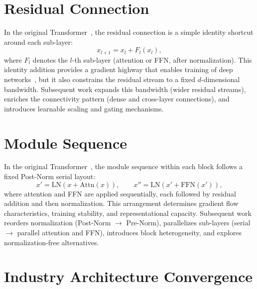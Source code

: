 \documentclass[11pt, a4paper]{article}
\begin{document}


\section{Residual Connection}
\label{sec:residual-connection}

In the original Transformer~\cite{vaswani2017attention}, the residual connection is a simple identity shortcut around each sub-layer:
\begin{equation}
\label{eq:residual_def}
x_{l+1} = x_l + F_l(x_l),
\end{equation}
where $F_l$ denotes the $l$-th sub-layer (attention or FFN, after normalization).
This identity addition provides a gradient highway that enables training of deep networks~\cite{he2016deep}, but it also constrains the residual stream to a fixed $d$-dimensional bandwidth.
Subsequent work expands this bandwidth (wider residual streams), enriches the connectivity pattern (dense and cross-layer connections), and introduces learnable scaling and gating mechanisms.



\section{Module Sequence}
\label{sec:module-sequence}

In the original Transformer~\cite{vaswani2017attention}, the module sequence within each block follows a fixed Post-Norm serial layout:
\begin{equation}
\label{eq:modseq_def}
x' = \mathrm{LN}(x + \mathrm{Attn}(x)), \qquad
x'' = \mathrm{LN}(x' + \mathrm{FFN}(x')),
\end{equation}
where attention and FFN are applied sequentially, each followed by residual addition and then normalization.
This arrangement determines gradient flow characteristics, training stability, and representational capacity.
Subsequent work reorders normalization (Post-Norm $\to$ Pre-Norm), parallelizes sub-layers (serial $\to$ parallel attention and FFN), introduces block heterogeneity, and explores normalization-free alternatives.



\section{Industry Architecture Convergence}
\label{sec:industry}





\end{document}
